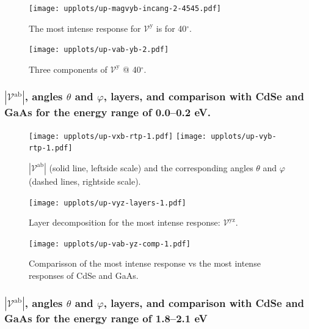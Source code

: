 \documentclass[twocolumn]{article}
\let\Oldsubsubsection\subsubsection
\renewcommand{\subsubsection}{\FloatBarrier\Oldsubsubsection}
\begin{document}
\begin{figure}[ht]
    \centering
    \texttt{[image: upplots/up-magvyb-incang-2-4545.pdf]}
    \caption{The most intense response for $\mathcal{V}^{\mathrm{y}} $ is for 
    40$^{\circ}$.}
    \label{fig:up-magybincang2}
\end{figure}
\begin{figure}[ht]
    \centering
    \texttt{[image: upplots/up-vab-yb-2.pdf]}
    \caption{Three components of $\mathcal{V}^{\mathrm{y}} $ @ 40$^{\circ}$.}
    \label{fig:upvyb2}
\end{figure}

\clearpage

\subsubsection{$|\mathcal{V}^{\mathrm{ab}}|$, angles
$\theta$ and $\varphi$, layers, and comparison with CdSe and GaAs for the energy
range of 0.0--0.2 eV.}

\begin{figure}[ht]
    \centering
    \texttt{[image: upplots/up-vxb-rtp-1.pdf]}
    \texttt{[image: upplots/up-vyb-rtp-1.pdf]}
    \caption{$|\mathcal{V}^{\mathrm{ab}}|$ (solid line, leftside scale) and the
    corresponding angles $\theta$ and $\varphi$ (dashed lines, rightside scale).}
    \label{fig:up-rtp1}
\end{figure}

\begin{figure}[ht]
    \centering
    \texttt{[image: upplots/up-vyz-layers-1.pdf]}
    \caption{Layer decomposition for the most intense response:
    $\mathcal{V}^{\mathrm{yz}}$.}
    \label{fig:up-lay1}
\end{figure}

\begin{figure}[ht]
    \centering
    \texttt{[image: upplots/up-vab-yz-comp-1.pdf]}
    \caption{Comparisson of the most intense response vs the most intense
    responses of CdSe and GaAs.}
    \label{fig:up-comp1}
\end{figure}

\subsubsection{$|\mathcal{V}^{\mathrm{ab}}|$, angles
$\theta$ and $\varphi$, layers, and comparison with CdSe and GaAs for the energy
range of 1.8--2.1 eV}
\end{document}
